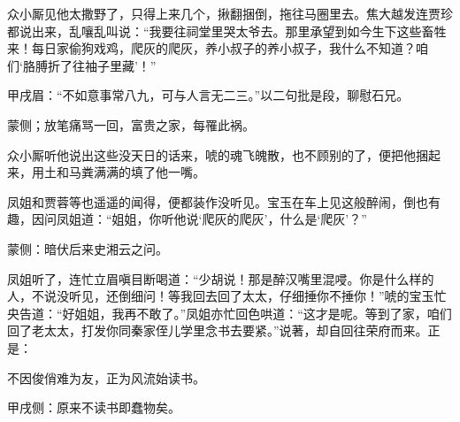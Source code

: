 \begin{parag}
    众小厮见他太撒野了，只得上来几个，揪翻捆倒，拖往马圈里去。焦大越发连贾珍都说出来，乱嚷乱叫说：“我要往祠堂里哭太爷去。那里承望到如今生下这些畜牲来！每日家偷狗戏鸡，爬灰的爬灰，养小叔子的养小叔子，我什么不知道？咱们‘胳膊折了往袖子里藏’！”\begin{note}甲戌眉：“不如意事常八九，可与人言无二三。”以二句批是段，聊慰石兄。\end{note}\begin{note}蒙侧；放笔痛骂一回，富贵之家，每罹此祸。\end{note}众小厮听他说出这些没天日的话来，唬的魂飞魄散，也不顾别的了，便把他捆起来，用土和马粪满满的填了他一嘴。
\end{parag}


\begin{parag}
    凤姐和贾蓉等也遥遥的闻得，便都装作没听见。宝玉在车上见这般醉闹，倒也有趣，因问凤姐道：“姐姐，你听他说‘爬灰的爬灰’，什么是‘爬灰’？”\begin{note}蒙侧：暗伏后来史湘云之问。\end{note}凤姐听了，连忙立眉嗔目断喝道：“少胡说！那是醉汉嘴里混唚。你是什么样的人，不说没听见，还倒细问！等我回去回了太太，仔细捶你不捶你！”唬的宝玉忙央告道：“好姐姐，我再不敢了。”凤姐亦忙回色哄道：“这才是呢。等到了家，咱们回了老太太，打发你同秦家侄儿学里念书去要紧。”说著，却自回往荣府而来。正是：
\end{parag}


\begin{poem}
    \begin{pl} 不因俊俏难为友，正为风流始读书。\end{pl}
    \begin{note}甲戌侧：原来不读书即蠢物矣。\end{note}
\end{poem}
